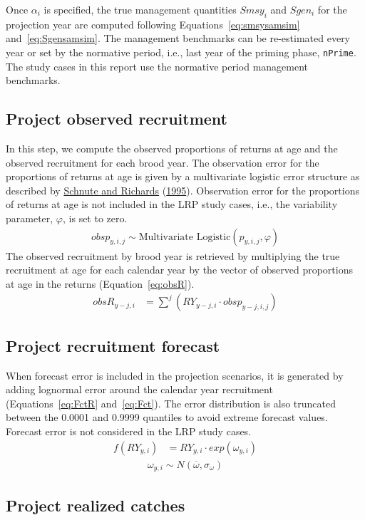 \documentclass[11pt]{book}
\begin{document}
Once \(\alpha_{i}\) is specified, the true management quantities \(Smsy_{i}\) and \(Sgen_{i}\) for the projection year are computed following Equations~\ref{eq:smsysamsim} and~\ref{eq:Sgensamsim}. The management benchmarks can be re-estimated every year or set by the normative period, i.e., last year of the priming phase, \texttt{nPrime}. The study cases in this report use the normative period management benchmarks.

\hypertarget{project-observed-recruitment}{%
\subsection{Project observed recruitment}\label{project-observed-recruitment}}

In this step, we compute the observed proportions of returns at age and the observed recruitment for each brood year. The observation error for the proportions of returns at age is given by a multivariate logistic error structure as described by \protect\hyperlink{ref-schnuteInfluenceErrorPopulation1995}{Schnute and Richards} (\protect\hyperlink{ref-schnuteInfluenceErrorPopulation1995}{1995}). Observation error for the proportions of returns at age is not included in the LRP study cases, i.e., the variability parameter, \(\varphi\), is set to zero.
\begin{align}
  obsp_{y,i,j} \sim \text{Multivariate Logistic}(p_{y,i,j}, \varphi) 
  \label{eq:obsppn}
\end{align}
The observed recruitment by brood year is retrieved by multiplying the true recruitment at age for each calendar year by the vector of observed proportions at age in the returns (Equation~\ref{eq:obsR}).
\begin{align}
  obsR_{y-j,i} &= \sum^j (RY_{y-j,i} \cdot obsp_{y-j,i,j})
  \label{eq:obsR}
\end{align}
\hypertarget{project-recruitment-forecast}{%
\subsection{Project recruitment forecast}\label{project-recruitment-forecast}}

When forecast error is included in the projection scenarios, it is generated by adding lognormal error around the calendar year recruitment (Equations~\ref{eq:FctR} and~\ref{eq:Fct}). The error distribution is also truncated between the 0.0001 and 0.9999 quantiles to avoid extreme forecast values. Forecast error is not considered in the LRP study cases.
\begin{align}
  f(RY_{y,i}) &= RY_{y,i} \cdot exp(\omega_{y,i})
  \label{eq:FctR}
\end{align}
\begin{align}
  \omega_{y,i} \sim N(\overline{\omega},\sigma_{\omega})
  \label{eq:Fct}
\end{align}
\hypertarget{project-realized-catches}{%
\subsection{Project realized catches}\label{project-realized-catches}}
\end{document}
